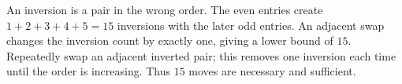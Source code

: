 An inversion is a pair in the wrong order. The even entries create $1+2+3+4+5=15$ inversions with the later odd entries. An adjacent swap changes the inversion count by exactly one, giving a lower bound of $15$. Repeatedly swap an adjacent inverted pair; this removes one inversion each time until the order is increasing. Thus $\boxed{15}$ moves are necessary and sufficient.
